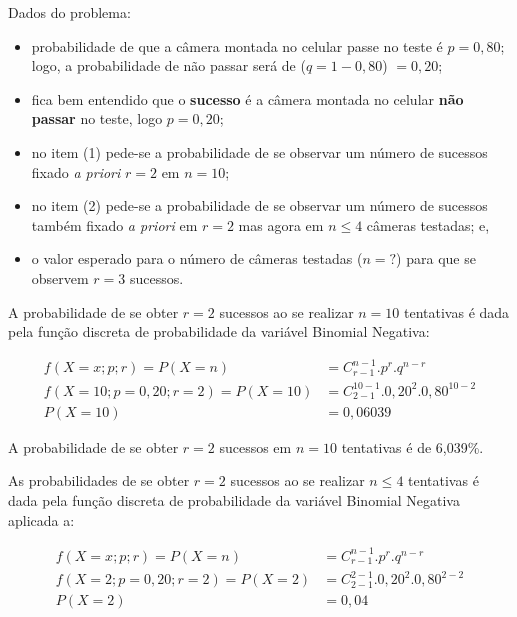 \documentclass[
]{book}
\providecommand{\tightlist}{%
  \setlength{\itemsep}{0pt}\setlength{\parskip}{0pt}}
\begin{document}
\hfill\break

Dados do problema:

\hfill\break

\begin{itemize}
\tightlist
\item
  probabilidade de que a câmera montada no celular passe no teste é \(p=0,80\); logo, a probabilidade de não passar será de (\(q=1-0,80\)) \(=0,20\);\\
\item
  fica bem entendido que o \textbf{sucesso} é a câmera montada no celular \textbf{não passar} no teste, logo \(p=0,20\);\\
\item
  no item (1) pede-se a probabilidade de se observar um número de sucessos fixado \emph{a priori} \(r=2\) em \(n=10\);\\
\item
  no item (2) pede-se a probabilidade de se observar um número de sucessos também fixado \emph{a priori} em \(r=2\) mas agora em \(n \leq 4\) câmeras testadas; e,\\
\item
  o valor esperado para o número de câmeras testadas (\(n=?\)) para que se observem \(r=3\) sucessos.
\end{itemize}

\hfill\break

A probabilidade de se obter \(r=2\) sucessos ao se realizar \(n=10\) tentativas é dada pela função discreta de probabilidade da variável Binomial Negativa:

\begin{align*}
f(X=x; p; r) = P(X=n) & = {C}_{r-1}^{n-1} . {p}^{r}. {q}^{n-r} \\
f(X=10; p=0,20 ; r=2) = P(X=10) & = {C}_{2-1}^{10-1} . {0,20}^{2}. {0,80}^{10-2} \\ 
P(X=10) & = 0,06039
\end{align*}

A probabilidade de se obter \(r=2\) sucessos em \(n=10\) tentativas é de 6,039\%.

\hfill\break

As probabilidades de se obter \(r=2\) sucessos ao se realizar \(n \leq 4\) tentativas é dada pela função discreta de probabilidade da variável Binomial Negativa aplicada a:

\begin{align*}
f(X=x; p; r) = P(X=n) & = {C}_{r-1}^{n-1} . {p}^{r}. {q}^{n-r} \\
f(X=2; p=0,20 ; r=2) = P(X=2)  & = {C}_{2-1}^{2-1} . {0,20}^{2}. {0,80}^{2-2} \\ 
P(X=2) & = 0,04
\end{align*}
\end{document}
